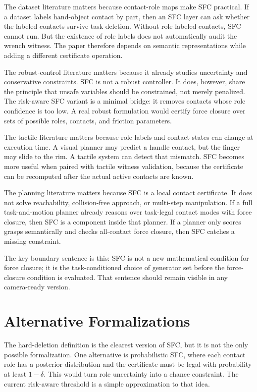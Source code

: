 \documentclass{article}
\begin{document}
The dataset literature matters because contact-role maps make SFC practical. If a dataset labels hand-object contact by part, then an SFC layer can ask whether the labeled contacts survive task deletion. Without role-labeled contacts, SFC cannot run. But the existence of role labels does not automatically audit the wrench witness. The paper therefore depends on semantic representations while adding a different certificate operation.

The robust-control literature matters because it already studies uncertainty and conservative constraints. SFC is not a robust controller. It does, however, share the principle that unsafe variables should be constrained, not merely penalized. The risk-aware SFC variant is a minimal bridge: it removes contacts whose role confidence is too low. A real robust formulation would certify force closure over sets of possible roles, contacts, and friction parameters.

The tactile literature matters because role labels and contact states can change at execution time. A visual planner may predict a handle contact, but the finger may slide to the rim. A tactile system can detect that mismatch. SFC becomes more useful when paired with tactile witness validation, because the certificate can be recomputed after the actual active contacts are known.

The planning literature matters because SFC is a local contact certificate. It does not solve reachability, collision-free approach, or multi-step manipulation. If a full task-and-motion planner already reasons over task-legal contact modes with force closure, then SFC is a component inside that planner. If a planner only scores grasps semantically and checks all-contact force closure, then SFC catches a missing constraint.

The key boundary sentence is this: SFC is not a new mathematical condition for force closure; it is the task-conditioned choice of generator set before the force-closure condition is evaluated. That sentence should remain visible in any camera-ready version.

\section{Alternative Formalizations}

The hard-deletion definition is the clearest version of SFC, but it is not the only possible formalization. One alternative is probabilistic SFC, where each contact role has a posterior distribution and the certificate must be legal with probability at least \(1-\delta\). This would turn role uncertainty into a chance constraint. The current risk-aware threshold is a simple approximation to that idea.
\end{document}
